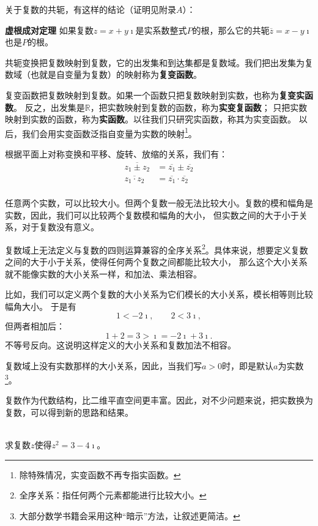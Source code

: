 \documentclass[12pt,UTF8]{ctexbook}
\begin{document}
关于复数的共轭，有这样的结论（证明见附录$A$）：
\begin{tm}{\textbf{虚根成对定理}}
    如果复数$z=x+y\imath$是实系数整式$P$的根，那么它的共轭$\overline{z}=x-y\imath$也是$P$的根。
\end{tm}

共轭变换把复数映射到复数，它的出发集和到达集都是复数域。我们把出发集为复数域（也就是自变量为复数）的映射称为\textbf{复变函数}。

复变函数把复数映射到复数。如果一个函数只把复数映射到实数，也称为\textbf{复变实函数}。
反之，出发集是$\mathbb{R}$，把实数映射到复数的函数，称为\textbf{实变复函数}；
只把实数映射到实数的函数，称为\textbf{实函数}。以往我们只研究实函数，称其为实变函数。
以后，我们会用实变函数泛指自变量为实数的映射\footnote{除特殊情况，实变函数不再专指实函数。}。

根据平面上对称变换和平移、旋转、放缩的关系，我们有：
\begin{align*}
    \overline{z_1 \pm z_2} &= \overline{z_1} \pm \overline{z_2} \\
    \overline{z_1 \cdot z_2} &= \overline{z_1} \cdot \overline{z_2} \\
\end{align*}

任意两个实数，可以比较大小。但两个复数一般无法比较大小。复数的模和幅角是实数，因此，我们可以比较两个复数模和幅角的大小，
但实数之间的大于小于关系，对于复数没有意义。

复数域上无法定义与复数的四则运算兼容的全序关系\footnote{全序关系：指任何两个元素都能进行比较大小。}。具体来说，想要定义复数之间的大于小于关系，使得任何两个复数之间都能比较大小，
那么这个大小关系就不能像实数的大小关系一样，和加法、乘法相容。

比如，我们可以定义两个复数的大小关系为它们模长的大小关系，模长相等则比较幅角大小。
于是有
$$1 < -2\imath, \qquad 2 < 3\imath,$$
但两者相加后：
$$ 1 + 2 = 3 > \imath = -2\imath + 3\imath.$$
不等号反向。这说明这样定义的大小关系和复数加法不相容。

复数域上没有实数那样的大小关系，因此，当我们写$a > 0$时，即是默认$a$为实数\footnote{大部分数学书籍会采用这种“暗示”方法，让叙述更简洁。}。

复数作为代数结构，比二维平直空间更丰富。因此，对不少问题来说，把实数换为复数，可以得到新的思路和结果。

\begin{et}
    \mbox{} \\
    求复数$z$使得$z^2 = 3 - 4\imath$。
\end{et}
\end{document}
